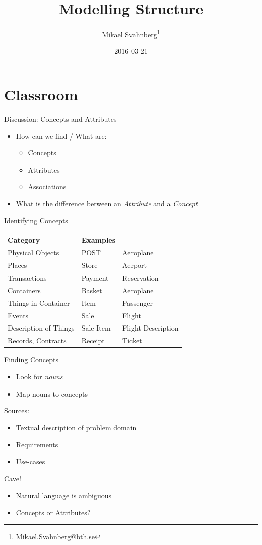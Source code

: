 \documentclass[10pt,t,a4paper]{beamer}
\author{Mikael Svahnberg\thanks{Mikael.Svahnberg@bth.se}}
\date{2016-03-21}
\title{Modelling Structure}
\begin{document}
\maketitle

\section{Classroom}
\label{sec-1}
\begin{frame}[label=sec-1-1]{Discussion: Concepts and Attributes}
\begin{itemize}
\item How can we find / What are:
\begin{itemize}
\item Concepts
\item Attributes
\item Associations
\end{itemize}
\item What is the difference between an \emph{Attribute} and a \emph{Concept}
\end{itemize}
\end{frame}
\begin{frame}[label=sec-1-2]{Identifying Concepts}
\begin{center}
\begin{tabular}{lll}
Category & Examples & \\
\hline
Physical Objects & POST & Aeroplane\\
Places & Store & Aerport\\
Transactions & Payment & Reservation\\
Containers & Basket & Aeroplane\\
Things in Container & Item & Passenger\\
Events & Sale & Flight\\
Description of Things & Sale Item & Flight Description\\
Records, Contracts & Receipt & Ticket\\
\hline
\end{tabular}
\end{center}
\end{frame}
\begin{frame}[label=sec-1-3]{Finding Concepts}
\begin{itemize}
\item Look for \emph{nouns}
\item Map nouns to concepts
\end{itemize}

Sources:     
\begin{itemize}
\item Textual description of problem domain
\item Requirements
\item Use-cases
\end{itemize}

Cave!
\begin{itemize}
\item Natural language is ambiguous
\item Concepts or Attributes?
\end{itemize}
\end{frame}
\end{document}
